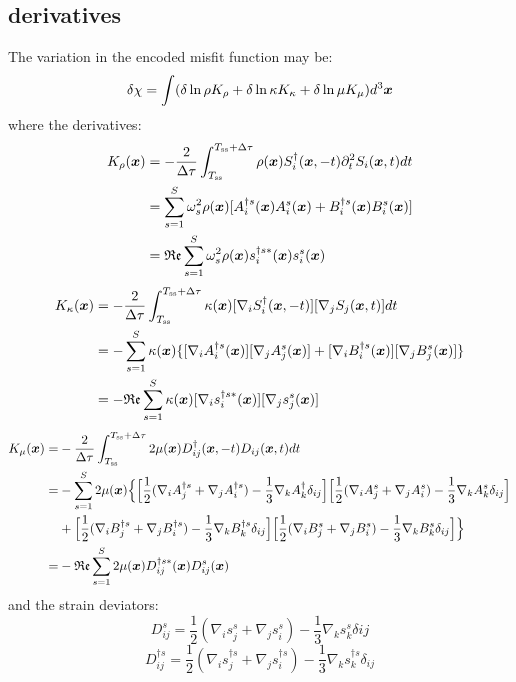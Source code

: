 \subsection{\Frechet derivatives}
The variation in the encoded misfit function may be:
\[ \delta\chi = \int (\delta\ln\rho K_\rho + \delta\ln\kappa K_\kappa
  + \delta\ln\mu K_\mu) d^3\boldsymbol{x} \]
where the \Frechet derivatives:
\begin{align*}
  K_\rho(\boldsymbol{x}) & = - \frac{2}{\Delta\tau} \int_{T_\text{ss}}^{T_\text{ss}
      +\Delta\tau} \rho(\boldsymbol{x}) S_i^\dagger(\boldsymbol{x}, -t)\partial_t^2
      S_i(\boldsymbol{x}, t) dt \\
    & = \sum_{s=1}^S \omega_s^2 \rho(\boldsymbol{x}) [ A_i^{\dagger s}(\boldsymbol{x})
      A_i^s(\boldsymbol{x}) + B_i^{\dagger s}(\boldsymbol{x}) B_i^s(\boldsymbol{x}) ] \\
    & = \mathfrak{Re} \sum_{s=1}^S \omega_s^2 \rho(\boldsymbol{x}) s_i^{\dagger s*}(\boldsymbol{x})
      s_i^s(\boldsymbol{x})
\end{align*}
\begin{align*}
  K_\kappa(\boldsymbol{x}) & = - \frac{2}{\Delta\tau} \int_{T_\text{ss}}^{T_\text{ss}
      +\Delta\tau} \kappa(\boldsymbol{x}) [ \nabla_i S_i^\dagger(\boldsymbol{x}, -t) ]
      [ \nabla_j S_j(\boldsymbol{x}, t) ] dt \\
    & = - \sum_{s=1}^S \kappa(\boldsymbol{x}) \{ [ \nabla_i A_i^{\dagger s}(\boldsymbol{x}) ]
      [ \nabla_j A_j^s(\boldsymbol{x}) ] + [ \nabla_i B_i^{\dagger s}(\boldsymbol{x}) ]
      [ \nabla_j B_j^s(\boldsymbol{x}) ] \} \\
    & = - \mathfrak{Re} \sum_{s=1}^S \kappa(\boldsymbol{x}) [ \nabla_i
      s_i^{\dagger s*}(\boldsymbol{x}) ] [ \nabla_j s_j^s(\boldsymbol{x}) ]
\end{align*}
\begin{align*}
  K_\mu(\boldsymbol{x}) = & - \frac{2}{\Delta\tau} \int_{T_\text{ss}}^{T_\text{ss}
      +\Delta\tau} 2\mu(\boldsymbol{x}) D_{ij}^\dagger(\boldsymbol{x}, -t)
      D_{ij}(\boldsymbol{x}, t) dt \\
    = & - \sum_{s=1}^S 2\mu(\boldsymbol{x}) \Big\{ \Big[ \frac{1}{2} ( \nabla_i
      A_j^{\dagger s} + \nabla_j A_i^{\dagger s}) - \frac{1}{3} \nabla_k
      A_k^{\dagger } \delta_{ij} \Big] \Big[ \frac{1}{2} (\nabla_i A_j^s
      + \nabla_j A_i^s) - \frac{1}{3} \nabla_k A_k^s \delta_{ij} \Big] \\
    & + \Big[ \frac{1}{2} (\nabla_i B_j^{\dagger s} + \nabla_j
      B_i^{\dagger s}) - \frac{1}{3} \nabla_k B_k^{\dagger s} \delta_{ij} \Big]
      \Big[ \frac{1}{2} (\nabla_i B_j^s + \nabla_j B_i^s) - \frac{1}{3}
      \nabla_k B_k^s \delta_{ij} \Big] \Big\} \\
    = & - \mathfrak{Re} \sum_{s=1}^S 2\mu(\boldsymbol{x}) D_{ij}^{\dagger s*}(\boldsymbol{x})
      D_{ij}^s(\boldsymbol{x})
\end{align*}
and the strain deviators:
\[ D_{ij}^s = \frac{1}{2} (\nabla_i s_j^s + \nabla_j s_i^s)
  - \frac{1}{3} \nabla_k s_k^s \delta{ij} \]
\[ D_{ij}^{\dagger s} = \frac{1}{2} (\nabla_i s_j^{\dagger s} + \nabla_j
  s_i^{\dagger s}) - \frac{1}{3} \nabla_k s_k^{\dagger s} \delta_{ij} \]

